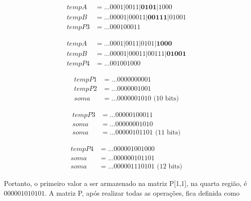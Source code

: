 \documentclass[12pt]{article}
\begin{document}
\begin{align*}
 tempA&= \ldots0001|0011|\textbf{0101}|1000\\
 tempB&= \ldots00001|00011|\textbf{00111}|01001\\
 tempP3&= \ldots000100011
\end{align*}

\begin{align*}
 tempA&= \ldots0001|0011|0101|\textbf{1000}\\
 tempB&= \ldots00001|00011|00111|\textbf{01001}\\
 tempP4&= \ldots001001000
\end{align*}



\begin{align*}
 tempP1&= \ldots0000000001 \\
 tempP2&= \ldots0000001001 \\
   soma&= \ldots0000001010 \text{ (10 bits)}
\end{align*}

\begin{align*}
 tempP3&= \ldots00000100011 \\
   soma&= \ldots00000001010 \\
   soma&= \ldots00000101101 \text{ (11 bits)}
\end{align*}

\begin{align*}
 tempP4&= \ldots000001001000 \\
 soma&=   \ldots000000101101 \\
 soma&=   \ldots000001110101 \text{ (12 bits)}
\end{align*}

Portanto, o primeiro valor a ser armazenado na matriz P[1,1], na quarta região,
é $000001010101$. A matriz P, após realizar todas as operações, fica definida
como
\end{document}
